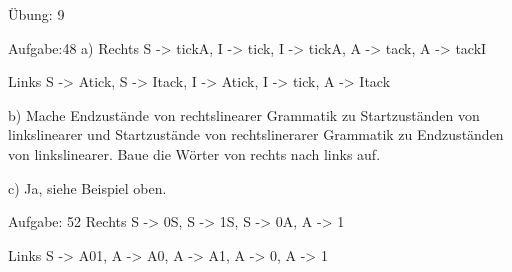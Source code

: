 Übung: 9

Aufgabe:48
a)
Rechts
S -> tickA,
I -> tick,
I -> tickA,
A -> tack,
A -> tackI

Links
S -> Atick,
S -> Itack,
I -> Atick,
I -> tick,
A -> Itack

b)
Mache Endzustände von rechtslinearer Grammatik zu Startzuständen von linkslinearer und
Startzustände von rechtslinerarer Grammatik zu Endzuständen von linkslinearer.
Baue die Wörter von rechts nach links auf.

c)
Ja, siehe Beispiel oben.


Aufgabe: 52
Rechts
S -> 0S,
S -> 1S,
S -> 0A,
A -> 1

Links
S -> A01,
A -> A0,
A -> A1,
A -> 0,
A -> 1
